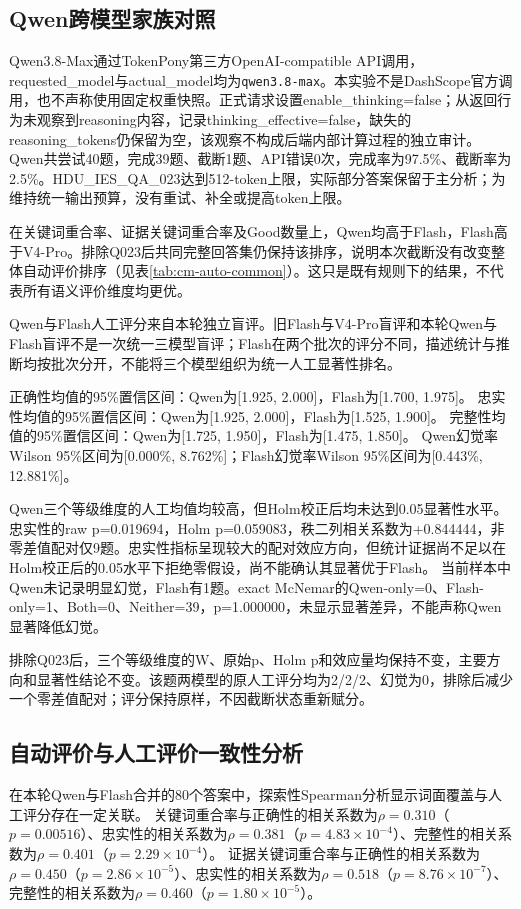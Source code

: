 \subsection{Qwen跨模型家族对照}
Qwen3.8-Max通过TokenPony第三方OpenAI-compatible API调用，requested\_model与actual\_model均为\texttt{qwen3.8-max}。本实验不是DashScope官方调用，也不声称使用固定权重快照。正式请求设置enable\_thinking=false；从返回行为未观察到reasoning内容，记录thinking\_effective=false，缺失的reasoning\_tokens仍保留为空，该观察不构成后端内部计算过程的独立审计。
Qwen共尝试40题，完成39题、截断1题、API错误0次，完成率为97.5\%、截断率为2.5\%。HDU\_IES\_QA\_023达到512-token上限，实际部分答案保留于主分析；为维持统一输出预算，没有重试、补全或提高token上限。

在关键词重合率、证据关键词重合率及Good数量上，Qwen均高于Flash，Flash高于V4-Pro。排除Q023后共同完整回答集仍保持该排序，说明本次截断没有改变整体自动评价排序（见表\ref{tab:cm-auto-common}）。这只是既有规则下的结果，不代表所有语义评价维度均更优。


Qwen与Flash人工评分来自本轮独立盲评。旧Flash与V4-Pro盲评和本轮Qwen与Flash盲评不是一次统一三模型盲评；Flash在两个批次的评分不同，描述统计与推断均按批次分开，不能将三个模型组织为统一人工显著性排名。

正确性均值的95\%置信区间：Qwen为[1.925, 2.000]，Flash为[1.700, 1.975]。
忠实性均值的95\%置信区间：Qwen为[1.925, 2.000]，Flash为[1.525, 1.900]。
完整性均值的95\%置信区间：Qwen为[1.725, 1.950]，Flash为[1.475, 1.850]。
Qwen幻觉率Wilson 95\%区间为[0.000\%, 8.762\%]；Flash幻觉率Wilson 95\%区间为[0.443\%, 12.881\%]。

Qwen三个等级维度的人工均值均较高，但Holm校正后均未达到0.05显著性水平。忠实性的raw p=0.019694，Holm p=0.059083，秩二列相关系数为+0.844444，非零差值配对仅9题。忠实性指标呈现较大的配对效应方向，但统计证据尚不足以在Holm校正后的0.05水平下拒绝零假设，尚不能确认其显著优于Flash。
当前样本中Qwen未记录明显幻觉，Flash有1题。exact McNemar的Qwen-only=0、Flash-only=1、Both=0、Neither=39，p=1.000000，未显示显著差异，不能声称Qwen显著降低幻觉。


排除Q023后，三个等级维度的W、原始p、Holm p和效应量均保持不变，主要方向和显著性结论不变。该题两模型的原人工评分均为2/2/2、幻觉为0，排除后减少一个零差值配对；评分保持原样，不因截断状态重新赋分。

\subsection{自动评价与人工评价一致性分析}
在本轮Qwen与Flash合并的80个答案中，探索性Spearman分析显示词面覆盖与人工评分存在一定关联。
关键词重合率与正确性的相关系数为$\rho=0.310$（$p=0.00516$）、忠实性的相关系数为$\rho=0.381$（$p=4.83\times10^{-4}$）、完整性的相关系数为$\rho=0.401$（$p=2.29\times10^{-4}$）。
证据关键词重合率与正确性的相关系数为$\rho=0.450$（$p=2.86\times10^{-5}$）、忠实性的相关系数为$\rho=0.518$（$p=8.76\times10^{-7}$）、完整性的相关系数为$\rho=0.460$（$p=1.80\times10^{-5}$）。

